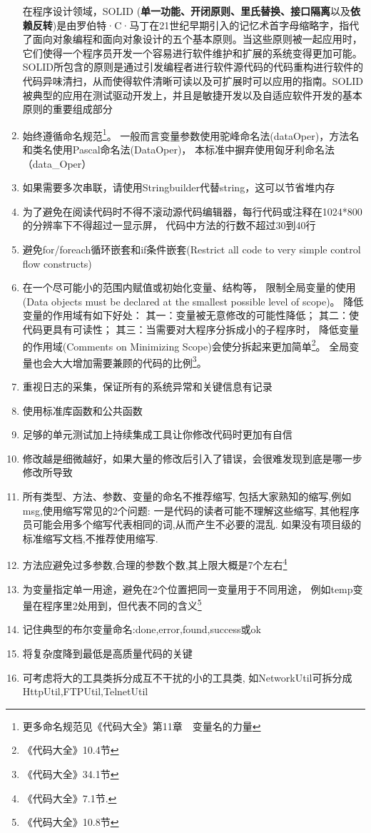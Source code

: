 \documentclass{book}
\begin{document}
\begin{enumerate}
在程序设计领域，SOLID (\textbf{单一功能、开闭原则、里氏替换、接口隔离}以及\textbf{依赖反转})是由罗伯特·C·马丁在21世纪早期引入的记忆术首字母缩略字，指代了面向对象编程和面向对象设计的五个基本原则。当这些原则被一起应用时，它们使得一个程序员开发一个容易进行软件维护和扩展的系统变得更加可能。SOLID所包含的原则是通过引发编程者进行软件源代码的代码重构进行软件的代码异味清扫，从而使得软件清晰可读以及可扩展时可以应用的指南。SOLID被典型的应用在测试驱动开发上，并且是敏捷开发以及自适应软件开发的基本原则的重要组成部分
\item{始终遵循命名规范\footnote{更多命名规范见《代码大全》第11章~~变量名的力量}。
一般而言变量参数使用驼峰命名法(dataOper)，方法名和类名使用Pascal命名法(DataOper)，
本标准中摒弃使用匈牙利命名法（data\_Oper）}
\item{如果需要多次串联，请使用Stringbuilder代替string，这可以节省堆内存}
\item{为了避免在阅读代码时不得不滚动源代码编辑器，每行代码或注释在1024*800的分辨率下不得超过一显示屏，
代码中方法的行数不超过30到40行}
\item{避免for/foreach循环嵌套和if条件嵌套(Restrict all code to very simple control flow constructs)}
\item{在一个尽可能小的范围内赋值或初始化变量、结构等，
限制全局变量的使用(Data objects must be declared at the smallest possible level of scope)。
降低变量的作用域有如下好处：
其一：变量被无意修改的可能性降低；
其二：使代码更具有可读性；
其三：当需要对大程序分拆成小的子程序时，
降低变量的作用域(Comments on Minimizing Scope)会使分拆起来更加简单\footnote{《代码大全》10.4节}。
全局变量也会大大增加需要兼顾的代码的比例\footnote{《代码大全》34.1节}。}
\item{重视日志的采集，保证所有的系统异常和关键信息有记录}	
\item{使用标准库函数和公共函数}	
\item{足够的单元测试加上持续集成工具让你修改代码时更加有自信}
\item{修改越是细微越好，如果大量的修改后引入了错误，会很难发现到底是哪一步修改所导致}
\item{所有类型、方法、参数、变量的命名不推荐缩写,
包括大家熟知的缩写,例如 msg,使用缩写常见的2个问题:
一是代码的读者可能不理解这些缩写,
其他程序员可能会用多个缩写代表相同的词,从而产生不必要的混乱.
如果没有项目级的标准缩写文档,不推荐使用缩写.}
\item{方法应避免过多参数,合理的参数个数,其上限大概是7个左右\footnote{《代码大全》7.1节.}}
\item{为变量指定单一用途，避免在2个位置把同一变量用于不同用途，
例如temp变量在程序里2处用到，但代表不同的含义\footnote{《代码大全》10.8节}}
\item{记住典型的布尔变量命名:done,error,found,success或ok}
\item{将复杂度降到最低是高质量代码的关键}
\item{可考虑将大的工具类拆分成互不干扰的小的工具类,
如NetworkUtil可拆分成HttpUtil,FTPUtil,TelnetUtil}
\end{enumerate}	
\end{document}
